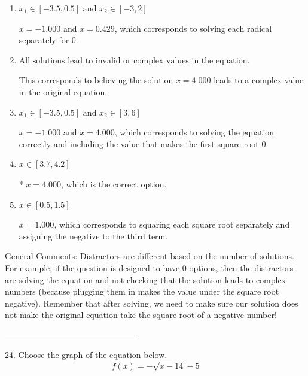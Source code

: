 \documentclass{extbook}[14pt]
\begin{document}
\begin{enumerate}[label=\Alph*.] 
\item $ x_1 \in [-3.5, 0.5] \text{ and } x_2 \in [-3,2] $ 

 $x = -1.000$ and $x = 0.429$, which corresponds to solving each radical separately for 0. 
\item $ \text{All solutions lead to invalid or complex values in the equation.} $ 

 This corresponds to believing the solution $x = 4.000$ leads to a complex value in the original equation. 
\item $ x_1 \in [-3.5, 0.5] \text{ and } x_2 \in [3,6] $ 

 $x = -1.000$ and $x = 4.000$, which corresponds to solving the equation correctly and including the value that makes the first square root 0. 
\item $ x \in [3.7,4.2] $ 

 * $x = 4.000$, which is the correct option. 
\item $ x \in [0.5,1.5] $ 

 $x = 1.000$, which corresponds to squaring each square root separately and assigning the negative to the third term. 
\end{enumerate} 
 
General Comments: Distractors are different based on the number of solutions. For example, if the question is designed to have 0 options, then the distractors are solving the equation and not checking that the solution leads to complex numbers (because plugging them in makes the value under the square root negative). Remember that after solving, we need to make sure our solution does not make the original equation take the square root of a negative number!

-----------------------------------------------

24. Choose the graph of the equation below.
\[ f(x) = - \sqrt{x - 14} - 5 \] 
\end{document}
